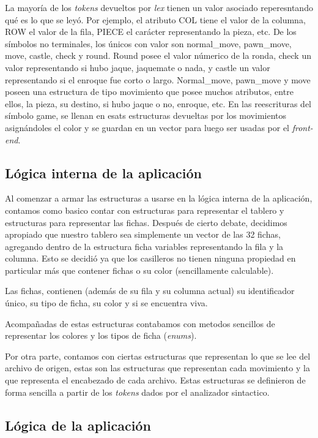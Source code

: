 \documentclass[a4paper,10pt]{article}
\begin{document}
La mayoría de los \textit{tokens} devueltos por \textit{lex} tienen un valor asociado reperesntando qué es lo que se leyó. Por ejemplo, 
el atributo COL tiene el valor de la columna, ROW el valor de la fila, PIECE el carácter representando la pieza, etc.
De los símbolos no terminales, los únicos con valor son normal\_move, pawn\_move, move, castle, check y round. Round posee el valor númerico de la ronda, 
check un valor representando si hubo jaque, jaquemate o nada, y castle un valor representando si el enroque fue corto o largo. Normal\_move, pawn\_move 
y move poseen una estructura de tipo movimiento que posee muchos atributos, entre ellos, la pieza, su destino, si hubo jaque o no, enroque, etc. En las 
reescrituras del símbolo game, se llenan en esats estructuras devueltas por los movimientos asignándoles el color y se guardan en un vector para luego 
ser usadas por el \textit{front-end}.

\subsection{Lógica interna de la aplicación }

Al comenzar a armar las estructuras a usarse en la lógica interna de la aplicación, contamos como basico contar con estructuras
para representar el tablero y estructuras para representar las fichas. Después de cierto debate, decidimos apropiado que nuestro
tablero sea simplemente un vector de las 32 fichas, agregando dentro de la estructura ficha variables representando la fila y la 
columna. Esto se decidió ya que los casilleros no tienen ninguna propiedad en particular más que contener fichas o su color 
(sencillamente calculable).

Las fichas, contienen (además de su fila y su columna actual) su identificador único, su tipo de ficha, su color y si se encuentra 
viva.

Acompañadas de estas estructuras contabamos con metodos sencillos de representar los colores y los tipos de ficha (\textit{enums}).

Por otra parte, contamos con ciertas estructuras que representan lo que se lee del archivo de origen, estas son las estructuras que 
representan cada movimiento y la que representa el encabezado de cada archivo. Estas estructuras se definieron de forma sencilla a 
partir de los \textit{tokens} dados por el analizador sintactico.


\subsection{Lógica de la aplicación}
\end{document}

